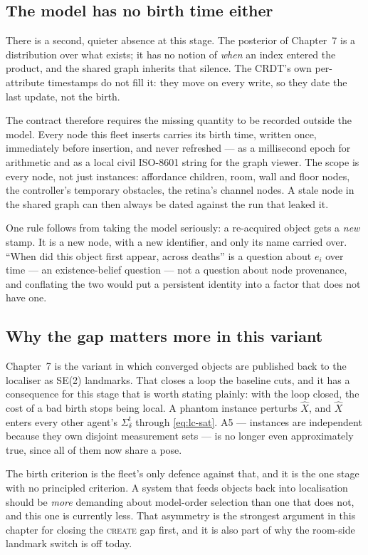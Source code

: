 \documentclass[11pt,a4paper]{report}
\newcommand{\stage}[1]{\textsc{#1}}
\newcommand{\Create}{\stage{create}}
\begin{document}
\subsection{The model has no birth time either}
\label{sec:provenance}

There is a second, quieter absence at this stage. The posterior of Chapter~7 is a distribution over
what exists; it has no notion of \emph{when} an index entered the product, and the shared graph
inherits that silence. The CRDT's own per-attribute timestamps do not fill it: they move on every
write, so they date the last update, not the birth.

The contract therefore requires the missing quantity to be recorded outside the model. Every node
this fleet inserts carries its birth time, written once, immediately before insertion, and never
refreshed --- as a millisecond epoch for arithmetic and as a local civil ISO-8601 string for the
graph viewer. The scope is every node, not just instances: affordance children, room, wall and floor
nodes, the controller's temporary obstacles, the retina's channel nodes. A stale node in the
shared graph can then always be dated against the run that leaked it.

One rule follows from taking the model seriously: a re-acquired object gets a \emph{new} stamp. It is
a new node, with a new identifier, and only its name carried over. ``When did this object first
appear, across deaths'' is a question about $e_i$ over time --- an existence-belief question --- not
a question about node provenance, and conflating the two would put a persistent identity into a
factor that does not have one.

\subsection{Why the gap matters more in this variant}
\label{sec:variant}

Chapter~7 is the variant in which converged objects are published back to the localiser as SE(2)
landmarks. That closes a loop the baseline cuts, and it has a consequence for this stage that is
worth stating plainly: with the loop closed, the cost of a bad birth stops being local. A phantom
instance perturbs $\hat X$, and $\hat X$ enters every other agent's $\Sigma_\delta^t$ through
\eqref{eq:lc-sat}. A5 --- instances are independent because they own disjoint measurement sets ---
is no longer even approximately true, since all of them now share a pose.

The birth criterion is the fleet's only defence against that, and it is the one stage with no
principled criterion. A system that feeds objects back into localisation should be \emph{more}
demanding about model-order selection than one that does not, and this one is currently less. That
asymmetry is the strongest argument in this chapter for closing the \Create{} gap first, and it is
also part of why the room-side landmark switch is off today.
\end{document}
